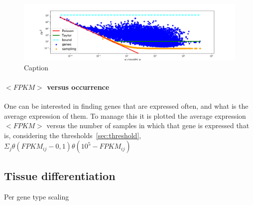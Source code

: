 \begin{figure}[htb!]
    \centering
    \includegraphics[width=0.9\linewidth]{pictures/scalelaws/gtex/cvmean_loglog_sampling.png}
    \caption{Caption}
    \label{fig:scalelaws/gtex/cvmean_loglog_sampling}
\end{figure}




\paragraph{$<FPKM>$ versus occurrence}
One can be interested in finding genes that are expressed often, and what is the 
average expression of them.
To manage this it is plotted the average expression $<FPKM>$ versus the number 
of samples in which that gene is expressed that is, considering the thresholds~\ref{sec:threshold}, 
$\Sigma_j\theta (FPKM_{ij}-0,1)\theta (10^5-FPKM_{ij})$

\subsection{Tissue differentiation}
Per gene type scaling




